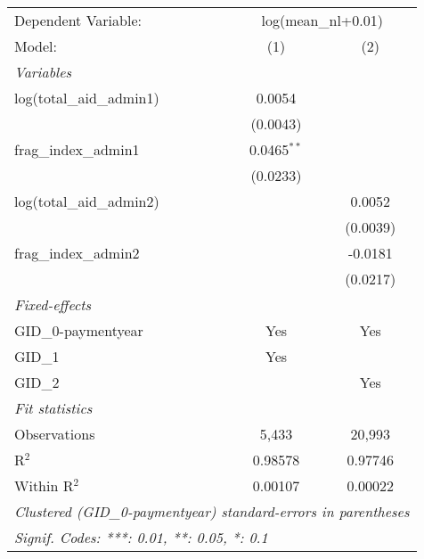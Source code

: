 
\begingroup
\centering
\begin{tabular}{lcc}
   \tabularnewline \midrule \midrule
   Dependent Variable: & \multicolumn{2}{c}{log(mean\_nl+0.01)}\\
   Model:                    & (1)           & (2)\\  
   \midrule
   \emph{Variables}\\
   log(total\_aid\_admin1)   & 0.0054        &   \\   
                             & (0.0043)      &   \\   
   frag\_index\_admin1       & 0.0465$^{**}$ &   \\   
                             & (0.0233)      &   \\   
   log(total\_aid\_admin2)   &               & 0.0052\\   
                             &               & (0.0039)\\   
   frag\_index\_admin2       &               & -0.0181\\   
                             &               & (0.0217)\\   
   \midrule
   \emph{Fixed-effects}\\
   GID\_0-paymentyear        & Yes           & Yes\\  
   GID\_1                    & Yes           & \\  
   GID\_2                    &               & Yes\\  
   \midrule
   \emph{Fit statistics}\\
   Observations              & 5,433         & 20,993\\  
   R$^2$                     & 0.98578       & 0.97746\\  
   Within R$^2$              & 0.00107       & 0.00022\\  
   \midrule \midrule
   \multicolumn{3}{l}{\emph{Clustered (GID\_0-paymentyear) standard-errors in parentheses}}\\
   \multicolumn{3}{l}{\emph{Signif. Codes: ***: 0.01, **: 0.05, *: 0.1}}\\
\end{tabular}
\par\endgroup



